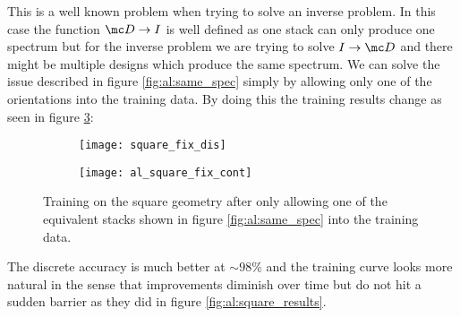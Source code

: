 \newpage
This is a well known problem when trying to solve an inverse problem. In this case the function $\mc D \rightarrow I$ is well defined as one stack can only produce one spectrum but for the inverse problem we are trying to solve $I \rightarrow \mc D$ and there might be multiple designs which produce the same spectrum. We can solve the issue described in figure \ref{fig:al:same_spec} simply by allowing only one of the orientations into the training data. By doing this the training  results change as seen in figure \ref{fig:al:squares_fix}:

\begin{figure}[H]
\centering
\begin{subfigure}{.5\textwidth}
    \centering
    \texttt{[image: square\_fix\_dis]}
    \caption{}
    \label{}
\end{subfigure}%
\begin{subfigure}{.5\textwidth}
    \centering
    \texttt{[image: al\_square\_fix\_cont]}
    \caption{}
    \label{}
\end{subfigure}
\caption{Training on the square geometry after only allowing one of the equivalent stacks shown in figure \ref{fig:al:same_spec} into the training data.}
\label{fig:al:squares_fix}
\end{figure}

The discrete accuracy is much better at $\sim 98 \%$ and the training curve looks more natural in the sense that improvements diminish over time but do not hit a sudden barrier as they did in figure \ref{fig:al:square_results}.
